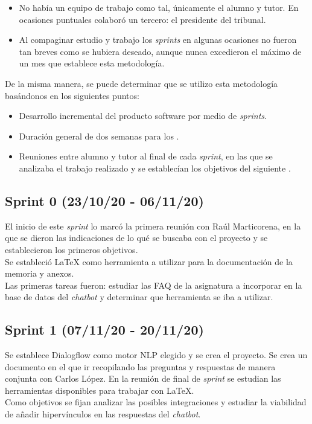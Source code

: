	\begin{itemize}
	\tightlist
	\item
	No había un equipo de trabajo como tal, únicamente el alumno y tutor. En ocasiones puntuales colaboró un tercero: el presidente del tribunal. 
	\item
	 Al compaginar estudio y trabajo los \textit{sprints} en algunas ocasiones no fueron tan breves como se hubiera deseado, aunque nunca excedieron el máximo de un mes que establece esta metodología.
	\end{itemize}

De la misma manera, se puede determinar que se utilizo esta metodología basándonos en los siguientes puntos:
	\begin{itemize}
	\tightlist
	\item
	Desarrollo incremental del producto software por medio de \textit{sprints}.
	\item
	Duración general de dos semanas para los .
	\item
	Reuniones entre alumno y tutor al final de cada \textit{sprint}, en las que se analizaba el trabajo realizado y se establecían los objetivos del siguiente .
	\end{itemize}


\subsection{Sprint 0 (23/10/20 - 06/11/20)}

El inicio de este \textit{sprint} lo marcó la primera reunión con Raúl Marticorena, en la que se dieron las indicaciones de lo qué se buscaba con el proyecto y se establecieron los primeros objetivos.\\
Se estableció LaTeX como herramienta a utilizar para la documentación de la memoria y anexos.\\
Las primeras tareas fueron: estudiar las FAQ de la asignatura a incorporar en la base de datos del \textit{chatbot} y determinar que herramienta se iba a utilizar. 


\subsection{Sprint 1 (07/11/20 - 20/11/20)}

Se establece Dialogflow como motor NLP elegido y se crea el proyecto. 
Se crea un documento en el que ir recopilando las preguntas y respuestas de manera conjunta con Carlos López. 
En la reunión de final de \textit{sprint} se estudian las herramientas disponibles para trabajar con LaTeX.\\
Como objetivos se fijan analizar las posibles integraciones y estudiar la viabilidad de añadir hipervínculos en las respuestas del \textit{chatbot}.

